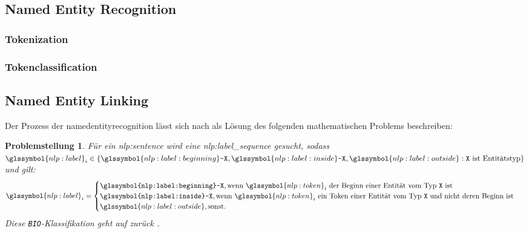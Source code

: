 \documentclass[
german,
]{bachelor}
\newtheorem{prob}{Problemstellung}
\begin{document}
\subsection{Named Entity Recognition}
\subsubsection{Tokenization}
\subsubsection{Tokenclassification}

\subsection{Named Entity Linking}
Der Prozess der \gls{namedentityrecognition}
lässt sich nach \autocite{2006.15509} als Lösung des folgenden mathematischen Problems beschreiben:

\begin{prob}{}\label{prob:nlp:ner}
	Für ein \gls{nlp:sentence} 
	wird eine \gls{nlp:label_sequence}  gesucht,
	sodass \(
	\glssymbol{nlp:label}_i \in
	\left\lbrace
	\glssymbol{nlp:label:beginning}\texttt{-X},
	\glssymbol{nlp:label:inside}\texttt{-X},
	\glssymbol{nlp:label:outside}
	:
	\text{\texttt{X} ist Entitätstyp}
	\right\rbrace
	\)
	und gilt:
	\[
		\glssymbol{nlp:label}_i =
		\begin{cases}
			\texttt{\glssymbol{nlp:label:beginning}-X},
			\text{wenn \(\glssymbol{nlp:token}_i\)
				der Beginn einer Entität vom Typ \(\texttt{X}\) ist
			} \\
			\texttt{\glssymbol{nlp:label:inside}-X},
			\text{wenn \(\glssymbol{nlp:token}_i\)
				ein Token einer Entität vom Typ \(\texttt{X}\)
				und nicht deren Beginn ist
			} \\
			\glssymbol{nlp:label:outside}, \text{sonst}.
		\end{cases}
	\]
	Diese \texttt{BIO}-Klassifikation geht auf \citeauthor{10.1145/2396761.2398506} zurück \autocite{10.1145/2396761.2398506}.
\end{prob}
\end{document}
